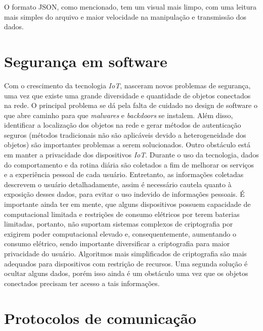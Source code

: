 \documentclass[../../layout.tex]{subfiles}
\begin{document}
O formato JSON, como mencionado, tem um visual mais limpo, com uma leitura mais simples do arquivo e maior velocidade na manipulação e transmissão dos dados.

\section{Segurança em software}
\hspace*{3em}Com o crescimento da tecnologia \emph{IoT}, nasceram novos problemas de segurança, uma vez que existe uma grande diversidade e quantidade de objetos conectados na rede. O principal problema se dá pela falta de cuidado no design de software o que abre caminho para que \emph{malwares} e \emph{backdoors} se instalem. Além disso, identificar a localização dos objetos na rede e gerar métodos de autenticação seguros (métodos tradicionais não são aplicáveis devido a heterogeneidade dos objetos) são importantes problemas a serem solucionados. Outro obstáculo está em manter a privacidade dos dispositivos \emph{IoT}. Durante o uso da tecnologia, dados do comportamento e da rotina diária são coletados a fim de melhorar os serviços e a experiência pessoal de cada usuário. Entretanto, as informações coletadas descrevem o usuário detalhadamente, assim é necessário cautela quanto à exposição desses dados, para evitar o uso indevido de informações pessoais. 
É importante ainda ter em mente, que alguns dispositivos possuem capacidade de computacional limitada e restrições de consumo elétricos por terem  baterias limitadas, portanto, não suportam  sistemas complexos de criptografia por exigirem poder computacional elevado e, consequentemente, aumentando o consumo elétrico, sendo importante diversificar a criptografia para maior privacidade do usuário. Algoritmos mais simplificados de criptografia são mais adequados para dispositivos com restrição de recursos. Uma segunda solução é ocultar alguns dados, porém isso ainda é um obstáculo uma vez que os objetos conectados precisam ter acesso a tais informações. \cite{seguranca}

\section{Protocolos de comunicação}
\end{document}
